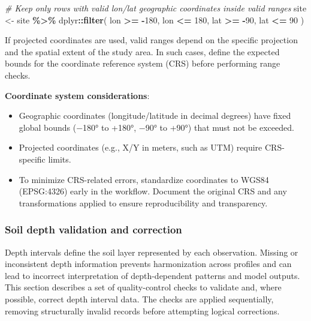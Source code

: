 \documentclass[
  10pt,
  b5paper,
  oneside]{book}
\newenvironment{Shaded}{\begin{snugshade}}{\end{snugshade}}
\newcommand{\CommentTok}[1]{\textcolor[rgb]{0.56,0.35,0.01}{\textit{#1}}}
\newcommand{\DecValTok}[1]{\textcolor[rgb]{0.00,0.00,0.81}{#1}}
\newcommand{\FunctionTok}[1]{\textcolor[rgb]{0.13,0.29,0.53}{\textbf{#1}}}
\newcommand{\NormalTok}[1]{#1}
\newcommand{\OtherTok}[1]{\textcolor[rgb]{0.56,0.35,0.01}{#1}}
\newcommand{\SpecialCharTok}[1]{\textcolor[rgb]{0.81,0.36,0.00}{\textbf{#1}}}
\begin{document}
\begin{Shaded}
\begin{Highlighting}[]
\CommentTok{\# Keep only rows with valid lon/lat geographic coordinates inside valid ranges}
\NormalTok{site }\OtherTok{\textless{}{-}}\NormalTok{ site }\SpecialCharTok{\%\textgreater{}\%}
\NormalTok{  dplyr}\SpecialCharTok{::}\FunctionTok{filter}\NormalTok{(}
\NormalTok{    lon }\SpecialCharTok{\textgreater{}=} \SpecialCharTok{{-}}\DecValTok{180}\NormalTok{, lon }\SpecialCharTok{\textless{}=} \DecValTok{180}\NormalTok{,}
\NormalTok{    lat }\SpecialCharTok{\textgreater{}=}  \SpecialCharTok{{-}}\DecValTok{90}\NormalTok{, lat }\SpecialCharTok{\textless{}=}  \DecValTok{90}
\NormalTok{  )}
\end{Highlighting}
\end{Shaded}

If projected coordinates are used, valid ranges depend on the specific projection and the spatial extent of the study area. In such cases, define the expected bounds for the coordinate reference system (CRS) before performing range checks.

\textbf{Coordinate system considerations}:

\begin{itemize}
\item
  Geographic coordinates (longitude/latitude in decimal degrees) have fixed global bounds (−180° to +180°, −90° to +90°) that must not be exceeded.
\item
  Projected coordinates (e.g., X/Y in meters, such as UTM) require CRS-specific limits.
\item
  To minimize CRS-related errors, standardize coordinates to WGS84 (EPSG:4326) early in the workflow. Document the original CRS and any transformations applied to ensure reproducibility and transparency.
\end{itemize}

\subsubsection{Soil depth validation and correction}\label{soil-depth-validation-and-correction}

Depth intervals define the soil layer represented by each observation. Missing or inconsistent depth information prevents harmonization across profiles and can lead to incorrect interpretation of depth-dependent patterns and model outputs. This section describes a set of quality-control checks to validate and, where possible, correct depth interval data. The checks are applied sequentially, removing structurally invalid records before attempting logical corrections.
\end{document}
